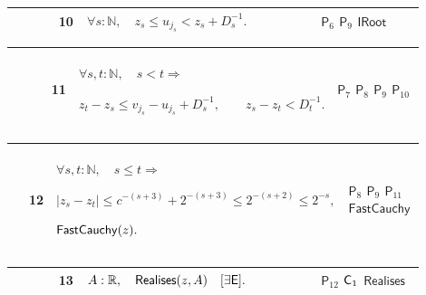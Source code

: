 \documentclass[12pt,reqno]{amsart}
\theoremstyle{blueplain}
\numberwithin{equation}{section}
\begin{document}
{\scriptsize \setlength{\parskip}{0pt}\nointerlineskip
\noindent 
\begin{tabular}{|@{}>{\centering\arraybackslash}m{0.10658\linewidth}|>{\centering\arraybackslash}m{0.03553\linewidth}|>{\centering\arraybackslash}m{0.52105\linewidth}|>{\centering\arraybackslash}m{0.23684\linewidth}|}
\hline
{\hypertarget{row:P10}{$\mathsf{P}$}} & {10} & {$\displaystyle \forall s:%
\mathbb{N},\quad z_s\le u_{j_s}<z_s+D_s^{-1}.$} & {\hyperlink{row:P6}{$%
\mathsf{P}_{6}$} \hyperlink{row:P9}{$\mathsf{P}_{9}$} \hyperlink{def:IRoot}{$%
\mathsf{IRoot}$}} \\ \hline
\end{tabular}%
}

{\scriptsize \setlength{\parskip}{0pt}\nointerlineskip
\noindent 
\begin{tabular}{|@{}>{\centering\arraybackslash}m{0.10658\linewidth}|>{\centering\arraybackslash}m{0.03553\linewidth}|>{\centering\arraybackslash}m{0.52105\linewidth}|>{\centering\arraybackslash}m{0.23684\linewidth}|}
\hline
{\hypertarget{row:P11}{$\mathsf{P}$}} & {11} & {$\displaystyle \forall s,t:%
\mathbb{N},\quad s<t\Rightarrow$ \par$\displaystyle z_t-z_s\le
v_{j_s}-u_{j_s}+D_s^{-1},\qquad z_s-z_t<D_t^{-1}.$} & {\hyperlink{row:P7}{$%
\mathsf{P}_{7}$} \hyperlink{row:P8}{$\mathsf{P}_{8}$} \hyperlink{row:P9}{$%
\mathsf{P}_{9}$} \hyperlink{row:P10}{$\mathsf{P}_{10}$}} \\ \hline
\end{tabular}%
}

{\scriptsize \setlength{\parskip}{0pt}\nointerlineskip
\noindent 
\begin{tabular}{|@{}>{\centering\arraybackslash}m{0.10658\linewidth}|>{\centering\arraybackslash}m{0.03553\linewidth}|>{\centering\arraybackslash}m{0.52105\linewidth}|>{\centering\arraybackslash}m{0.23684\linewidth}|}
\hline
{\hypertarget{row:P12}{$\mathsf{P}$}} & {12} & {$\displaystyle \forall s,t:%
\mathbb{N},\quad s\le t\Rightarrow$ \par$\displaystyle |z_s-z_t|\le
c^{-(s+3)}+2^{-(s+3)}\le2^{-(s+2)}\le2^{-s},$ \par$\displaystyle \hyperlink{def:FastCauchy}%
{\mathsf{FastCauchy} }(z).$} & {\hyperlink{row:P8}{$\mathsf{P}_{8}$} 
\hyperlink{row:P9}{$\mathsf{P}_{9}$} \hyperlink{row:P11}{$\mathsf{P}_{11}$} 
\hyperlink{def:FastCauchy}{$\mathsf{FastCauchy}$}} \\ \hline
\end{tabular}%
}

{\scriptsize \setlength{\parskip}{0pt}\nointerlineskip
\noindent 
\begin{tabular}{|@{}>{\centering\arraybackslash}m{0.10658\linewidth}|>{\centering\arraybackslash}m{0.03553\linewidth}|>{\centering\arraybackslash}m{0.52105\linewidth}|>{\centering\arraybackslash}m{0.23684\linewidth}|}
\hline
{\hypertarget{row:P13}{$\mathsf{P}$}} & {13} & {$\displaystyle A:\mathbb{R}%
,\quad \hyperlink{def:Realises}{\mathsf{Realises} }(z,A)\quad[\exists\mathsf{%
E}].$} & {\hyperlink{row:P12}{$\mathsf{P}_{12}$} \hyperlink{row:C1}{$\mathsf{%
C}_{1}$} \hyperlink{def:Realises}{$\mathsf{Realises}$}} \\ \hline
\end{tabular}%
}
\end{document}
